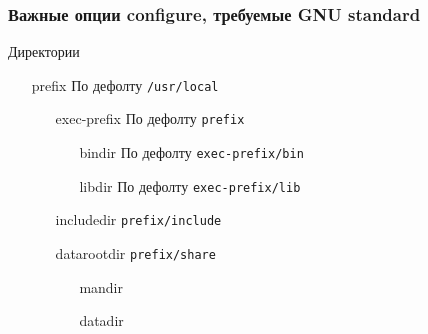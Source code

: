 




\begin{frame}
 \frametitle{Важные опции configure, требуемые GNU standard}
   Директории
    \begin{enumerate}
     \item[prefix] По дефолту \texttt{/usr/local}
      \begin{enumerate}
         \item[exec-prefix] По дефолту \texttt{prefix}
         \begin{enumerate}
            \item[bindir] По дефолту \texttt{exec-prefix/bin}
            \item[libdir] По дефолту \texttt{exec-prefix/lib}
         \end{enumerate}
         \item[includedir] \texttt{prefix/include}
         \item[datarootdir] \texttt{prefix/share}
         \begin{enumerate}
            \item[mandir]
            \item[datadir]
         \end{enumerate}
      \end{enumerate}
    \end{enumerate}

\end{frame}

